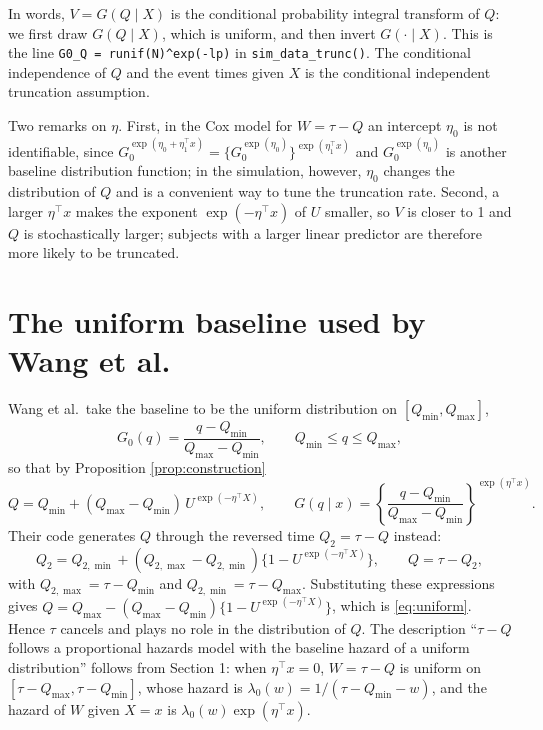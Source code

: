 \documentclass[11pt]{article}
\newcommand{\Qmin}{Q_{\min}}
\newcommand{\Qmax}{Q_{\max}}
\begin{document}
In words, $V = G(Q \mid X)$ is the conditional probability integral transform of $Q$: we
first draw $G(Q \mid X)$, which is uniform, and then invert $G(\cdot \mid X)$. This is the
line \texttt{G0\_Q = runif(N)\^{}exp(-lp)} in \texttt{sim\_data\_trunc()}. The conditional
independence of $Q$ and the event times given $X$ is the conditional independent
truncation assumption.

Two remarks on $\eta$. First, in the Cox model for $W = \tau - Q$ an intercept $\eta_0$ is
not identifiable, since $G_0^{\exp(\eta_0 + \eta_1^\top x)} = \{G_0^{\exp(\eta_0)}\}^{
\exp(\eta_1^\top x)}$ and $G_0^{\exp(\eta_0)}$ is another baseline distribution function;
in the simulation, however, $\eta_0$ changes the distribution of $Q$ and is a convenient
way to tune the truncation rate. Second, a larger $\eta^\top x$ makes the exponent
$\exp(-\eta^\top x)$ of $U$ smaller, so $V$ is closer to 1 and $Q$ is stochastically larger;
subjects with a larger linear predictor are therefore more likely to be truncated.

\section{The uniform baseline used by Wang et al.}

Wang et al.\ take the baseline to be the uniform distribution on $[\Qmin, \Qmax]$,
\begin{equation*}
G_0(q) = \frac{q - \Qmin}{\Qmax - \Qmin}, \qquad \Qmin \le q \le \Qmax,
\end{equation*}
so that by Proposition \ref{prop:construction}
\begin{equation}\label{eq:uniform}
Q = \Qmin + (\Qmax - \Qmin)\,U^{\exp(-\eta^\top X)}, \qquad
G(q \mid x) = \left\{\frac{q - \Qmin}{\Qmax - \Qmin}\right\}^{\exp(\eta^\top x)}.
\end{equation}
Their code generates $Q$ through the reversed time $Q_2 = \tau - Q$ instead:
\begin{equation*}
Q_2 = Q_{2,\min} + (Q_{2,\max} - Q_{2,\min})\{1 - U^{\exp(-\eta^\top X)}\},
\qquad Q = \tau - Q_2,
\end{equation*}
with $Q_{2,\max} = \tau - \Qmin$ and $Q_{2,\min} = \tau - \Qmax$. Substituting these
expressions gives $Q = \Qmax - (\Qmax - \Qmin)\{1 - U^{\exp(-\eta^\top X)}\}$, which is
\eqref{eq:uniform}. Hence $\tau$ cancels and plays no role in the distribution of $Q$.
The description ``$\tau - Q$ follows a proportional hazards model with the baseline hazard
of a uniform distribution'' follows from Section 1: when $\eta^\top x = 0$, $W = \tau - Q$
is uniform on $[\tau - \Qmax, \tau - \Qmin]$, whose hazard is
$\lambda_0(w) = 1/(\tau - \Qmin - w)$, and the hazard of $W$ given $X = x$ is
$\lambda_0(w)\exp(\eta^\top x)$.
\end{document}
